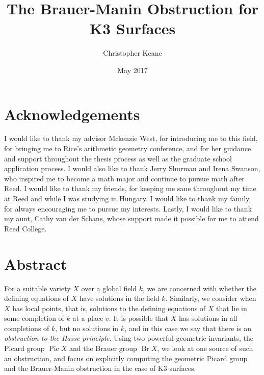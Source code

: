 \documentclass[12pt,twoside]{reedthesis}
\title{The Brauer-Manin Obstruction for K3 Surfaces}
\author{Christopher Keane}
\date{May 2017}
\theoremstyle{plain}
\theoremstyle{definition}
\theoremstyle{remark}
\newcommand{\Br}{\operatorname{Br}}
\newcommand{\Pic}{\operatorname{Pic}}
\begin{document}
\maketitle
\frontmatter 
\pagestyle{empty} 
\tableofcontents
\chapter*{Acknowledgements}
I would like to thank my advisor Mckenzie West, for introducing me to this field, for bringing me to Rice's arithmetic geometry conference, and for her guidance and support throughout the thesis process as well as the graduate school application process. I would also like to thank Jerry Shurman and Irena Swanson, who inspired me to become a math major and continue to pursue math after Reed. I would like to thank my friends, for keeping me sane throughout my time at Reed and while I was studying in Hungary. I would like to thank my family, for always encouraging me to pursue my interests. Lastly, I would like to thank my aunt, Cathy van der Schans, whose support made it possible for me to attend Reed College.
\chapter*{Abstract}
For a suitable variety $X$ over a global field $k$, we are concerned with whether the defining equations of $X$ have solutions in the field $k$. Similarly, we consider when $X$ has local points, that is, solutions to the defining equations of $X$ that lie in some completion of $k$ at a place $v$. It is possible that $X$ has solutions in all completions of $k$, but no solutions in $k$, and in this case we say that there is an \emph{obstruction to the Hasse principle}. Using two powerful geometric invariants, the Picard group $\Pic X$ and the Brauer group $\Br X$, we look at one source of such an obstruction, and focus on explicitly computing the geometric Picard group and the Brauer-Manin obstruction in the case of K3 surfaces.
\end{document}
